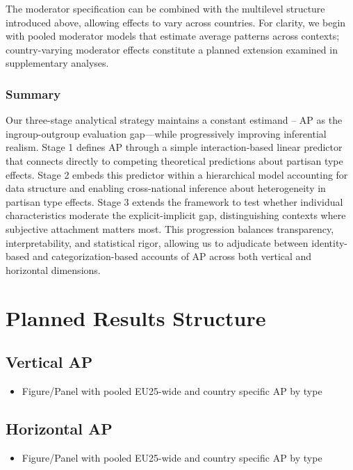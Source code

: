 \documentclass[
  12pt,
  a4paper,
  DIV=11,
  numbers=noendperiod]{scrartcl}
\providecommand{\tightlist}{%
  \setlength{\itemsep}{0pt}\setlength{\parskip}{0pt}}
\begin{document}
The moderator specification can be combined with the multilevel
structure introduced above, allowing effects to vary across countries.
For clarity, we begin with pooled moderator models that estimate average
patterns across contexts; country-varying moderator effects constitute a
planned extension examined in supplementary analyses.

\subsubsection{Summary}\label{sec-strategy-summary}

Our three-stage analytical strategy maintains a constant estimand -- AP
as the ingroup-outgroup evaluation gap---while progressively improving
inferential realism. Stage 1 defines AP through a simple
interaction-based linear predictor that connects directly to competing
theoretical predictions about partisan type effects. Stage 2 embeds this
predictor within a hierarchical model accounting for data structure and
enabling cross-national inference about heterogeneity in partisan type
effects. Stage 3 extends the framework to test whether individual
characteristics moderate the explicit-implicit gap, distinguishing
contexts where subjective attachment matters most. This progression
balances transparency, interpretability, and statistical rigor, allowing
us to adjudicate between identity-based and categorization-based
accounts of AP across both vertical and horizontal dimensions.

\section{Planned Results Structure}\label{sec-results-planned}

\subsection{Vertical AP}\label{vertical-ap}

\begin{itemize}
\tightlist
\item
  Figure/Panel with pooled EU25-wide and country specific AP by type
\end{itemize}

\subsection{Horizontal AP}\label{horizontal-ap}

\begin{itemize}
\tightlist
\item
  Figure/Panel with pooled EU25-wide and country specific AP by type
\end{itemize}
\end{document}
